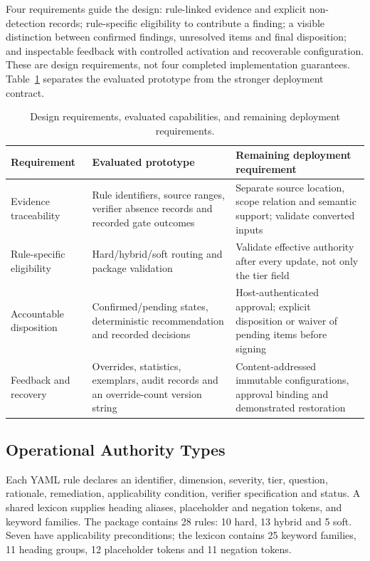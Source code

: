 \documentclass[computers,article,submit,moreauthors]{Definitions/mdpi}
\begin{document}
Four requirements guide the design: rule-linked evidence and explicit non-detection records; rule-specific eligibility to contribute a finding; a visible distinction between confirmed findings, unresolved items and final disposition; and inspectable feedback with controlled activation and recoverable configuration. These are design requirements, not four completed implementation guarantees. Table~\ref{tab:reqs} separates the evaluated prototype from the stronger deployment contract.

\begin{table}[!ht]
\caption{Design requirements, evaluated capabilities, and remaining deployment requirements.}
\label{tab:reqs}
\centering\footnotesize
\begin{tabularx}{\textwidth}{@{}p{2.4cm}XX@{}}
\toprule
Requirement & Evaluated prototype & Remaining deployment requirement \\
\midrule
Evidence traceability & Rule identifiers, source ranges, verifier absence records and recorded gate outcomes & Separate source location, scope relation and semantic support; validate converted inputs \\
Rule-specific eligibility & Hard/hybrid/soft routing and package validation & Validate effective authority after every update, not only the tier field \\
Accountable disposition & Confirmed/pending states, deterministic recommendation and recorded decisions & Host-authenticated approval; explicit disposition or waiver of pending items before signing \\
Feedback and recovery & Overrides, statistics, exemplars, audit records and an override-count version string & Content-addressed immutable configurations, approval binding and demonstrated restoration \\
\bottomrule
\end{tabularx}
\end{table}

\subsection{Operational Authority Types}\label{sec:rules}

Each YAML rule declares an identifier, dimension, severity, tier, question, rationale, remediation, applicability condition, verifier specification and status. A shared lexicon supplies heading aliases, placeholder and negation tokens, and keyword families. The package contains 28 rules: 10 hard, 13 hybrid and 5 soft. Seven have applicability preconditions; the lexicon contains 25 keyword families, 11 heading groups, 12 placeholder tokens and 11 negation tokens.
\end{document}
